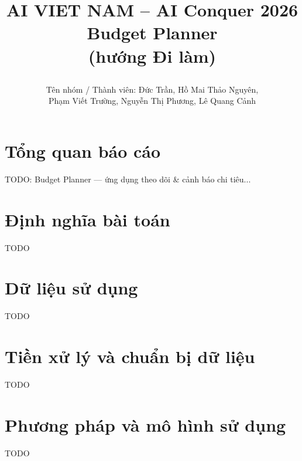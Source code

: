 \documentclass[12pt]{ai_conquer2026}
\title{%
  \begin{center}
        \Large {AI VIET NAM -- AI Conquer 2026}\\[.5ex]
        \Huge \textbf{Budget Planner \\ (hướng Đi làm)}\\[.5ex]
  \end{center}
}
\author{
        \begin{minipage}{\textwidth}
        \centering
        \vspace{-1.5em}
        Tên nhóm / Thành viên: Đức Trần, Hồ Mai Thảo Nguyên,\\
        Phạm Viết Trường, Nguyễn Thị Phương, Lê Quang Cảnh
        \end{minipage}
    }
\date{}
\begin{document}
\maketitle
\vspace{-5.5em}

\section{Tổng quan báo cáo}
TODO: Budget Planner — ứng dụng theo dõi & cảnh báo chi tiêu...

\newpage
\setcounter{tocdepth}{2}
\tableofcontents
\thispagestyle{fancy}
\newpage

\section{Định nghĩa bài toán}
TODO

\section{Dữ liệu sử dụng}
TODO

\section{Tiền xử lý và chuẩn bị dữ liệu}
TODO

\section{Phương pháp và mô hình sử dụng}
TODO
\end{document}
